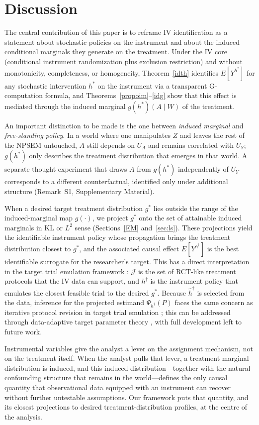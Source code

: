 \documentclass[12pt]{article}
\theoremstyle{thmstyleone}%
\theoremstyle{thmstyletwo}%
\theoremstyle{thmstylethree}%
\begin{document}
{
	\section{Discussion}\label{sec:disc}
	
	The central contribution of this paper is to reframe IV identification as a statement about stochastic policies on the instrument and about the {induced} conditional marginals they generate on the treatment. Under the IV core (conditional instrument randomization plus exclusion restriction) and without monotonicity, completeness, or homogeneity, Theorem~\ref{idth} identifies $E[Y^{h^*}]$ for any stochastic intervention $h^*$ on the instrument via a transparent G-computation formula, and Theorems~\ref{propoim}--\ref{idg} show that this effect is mediated through the induced marginal $g(h^*)(A\mid W)$ of the treatment.
	
	An important distinction to be made is the one between \emph{induced marginal} and \emph{free-standing policy}. In a world where one manipulates $Z$ and leaves the rest of the NPSEM untouched, $A$ still depends on $U_A$ and remains correlated with $U_Y$; $g(h^*)$ only describes the treatment distribution that emerges in that world. A separate thought experiment that draws $A$ from $g(h^*)$ independently of $U_Y$ corresponds to a different counterfactual, identified only under additional structure (Remark~S1, Supplementary Material).
	
	 {When a desired target treatment distribution $g^*$ lies outside the range of the induced-marginal map $g(\cdot)$, we project $g^*$ onto the set of attainable induced marginals in KL or $L^2$ sense (Sections~\ref{EM} and~\ref{sec:ls}). These projections yield the identifiable instrument policy whose propagation brings the treatment distribution closest to $g^*$, and the associated causal effect $E[Y^{h^\dagger}]$ is the best identifiable surrogate for the researcher's target. This has a direct interpretation in the target trial emulation framework \citep{hernan2016target}: $\mathcal{J}$ is the set of RCT-like treatment protocols that the IV data can support, and $h^\dagger$ is the instrument policy that emulates the closest feasible trial to the desired $g^*$. Because $\hat h^\dagger$ is selected from the data, inference for the projected estimand $\Psi_{h^\dagger}(P)$ faces the same concern as iterative protocol revision in target trial emulation \citep{stensrud2025target}; this can be addressed through data-adaptive target parameter theory \citep{hubbard2016statistical}, with full development left to future work.}

	 {Instrumental variables give the analyst a lever on the assignment mechanism, not on the treatment itself. When the analyst pulls that lever, a treatment marginal distribution is induced, and this induced distribution---together with the natural confounding structure that remains in the world---defines the only causal quantity that observational data equipped with an instrument can recover without further untestable assumptions. Our framework puts that quantity, and its closest projections to desired treatment-distribution profiles, at the centre of the analysis.}
}
\end{document}
